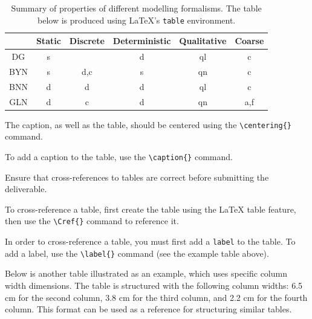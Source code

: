 \begin{table}[htb]
	\centering
	\caption{Summary of properties of different modelling formalisms. The table below is produced using \LaTeX's {\tt table} environment.}
	\label{tab:latextable}
	\begin{tabular}{|c|c|c|c|c|c|}
		\hline
		\rowcolor{gray!30} %
		& Static & Discrete & Deterministic & Qualitative & Coarse \\ 
	    \hline
	    DG & s &  & d & ql & c \\ \hline
	    BYN & s & d,c & s & qn & c\\ \hline
	    BNN & d & d & d & ql & c\\ \hline
	    GLN & d & c & d & qn & a,f\\ \hline
	\end{tabular}
\end{table}

The caption, as well as the table, should be centered using the \texttt{\textbackslash centering\{\}} command.

To add a caption to the table, use the \texttt{\textbackslash caption\{\}} command. 

Ensure that cross-references to tables are correct before submitting the deliverable. 

To cross-reference a table, first create the table using the LaTeX table feature, then use the \texttt{\textbackslash Cref\{\}} command to reference it.

In order to cross-reference a table, you must first add a \texttt{label} to the table. To add a label, use the \texttt{\textbackslash label\{\}} command (see the example table above).


Below is another table illustrated as an example, which uses specific column width dimensions. The table is structured with the following column widths: 6.5 cm for the second column, 3.8 cm for the third column, and 2.2 cm for the fourth column. This format can be used as a reference for structuring similar tables.

